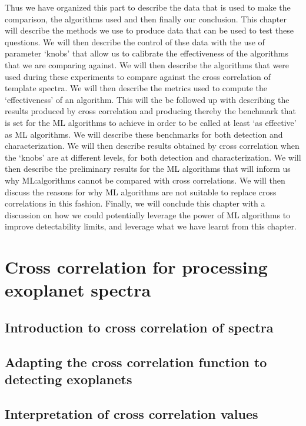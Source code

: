 Thus we have organized this part to describe the data that is used to make the comparison, the algorithms used and then finally our conclusion.
This chapter will describe the methods we use to produce data that can be used to test these questions.
We will then describe the control of thse data with the use of parameter `knobs' that allow us to calibrate the effectiveness of the algorithms that we are comparing against.
We will then describe the algorithms that were used during these experiments to compare against the cross correlation of template spectra. 
We will then describe the metrics used to compute the `effectiveness' of an algorithm.
This will the be followed up with describing the results produced by cross correlation and producing thereby the benchmark that is set for the ML algorithms to achieve in order to be called at least `as effective' as ML algorithms.
We will describe these benchmarks for both detection and characterization.
We will then describe results obtained by  cross correlation when the `knobs' are at different levels, for both detection and characterization.
We will then describe the preliminary results for the ML algorithms that will inform us why ML:algorithms cannot be compared with cross correlations.
We will then discuss the reasons for why ML algorithms are not suitable to replace cross correlations in this fashion.
Finally, we will conclude this chapter with a discussion on how we could potentially leverage the power of ML algorithms to improve detectability limits, and leverage what we have learnt from this chapter.
\chapter{Cross correlation for processing exoplanet spectra}
\section{Introduction to cross correlation of spectra}
\section{Adapting the cross correlation function to detecting exoplanets}
\section{Interpretation of cross correlation values}

